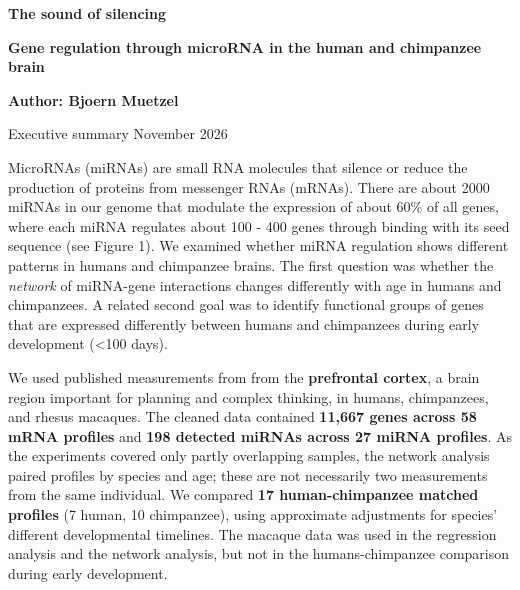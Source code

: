 \documentclass[11pt,letterpaper]{article}
\newcommand{\heading}[1]{\par\vspace{3pt}{\Large\bfseries #1}\par\vspace{0pt}}
\begin{document}
\begin{center}
{\LARGE\bfseries The sound of silencing}\par
\vspace{2pt}
{\normalsize\bfseries Gene regulation through microRNA in the human and chimpanzee brain}\par
\vspace{2pt}
{\normalsize\bfseries Author: Bjoern Muetzel}\par
\vspace{2pt}
{\small Executive summary \enspace\textbullet\enspace November 2026}
\end{center}
\vspace{-4pt}

\heading{Summary}
MicroRNAs (miRNAs) are small RNA molecules that silence or reduce the production of proteins from messenger RNAs (mRNAs). There are about 2000 miRNAs in our genome that modulate the expression of about 60\% of all genes, where each miRNA regulates about 100 - 400 genes through binding with its seed sequence (see Figure 1). We examined whether miRNA regulation shows different patterns in humans and chimpanzee brains. The first question was whether the \emph{network} of miRNA-gene interactions changes differently with age in humans and chimpanzees. A related second goal was to identify functional groups of genes that are expressed differently between humans and chimpanzees during early development (<100 days).\\

\heading{Data}
We used published measurements from \cite{so} from the \textbf{prefrontal cortex}, a brain region important for planning and complex thinking, in humans, chimpanzees, and rhesus macaques. The cleaned data contained \textbf{11,667 genes across 58 mRNA profiles} and \textbf{198 detected miRNAs across 27 miRNA profiles}. As the experiments covered only partly overlapping samples, the network analysis paired profiles by species and age; these are not necessarily two measurements from the same individual. We compared \textbf{17 human-chimpanzee matched profiles} (7 human, 10 chimpanzee), using approximate adjustments for species' different developmental timelines. The macaque data was used in the regression analysis and the network analysis, but not in the humans-chimpanzee comparison during early development.\\
\end{document}
